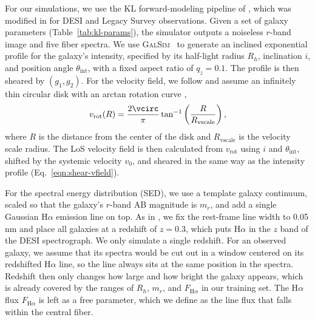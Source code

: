 For our simulations, we use the KL forward-modeling pipeline of \citep{KLInferenceI}, which was modified in \citep{KLDESI} for DESI and Legacy Survey observations. Given a set of galaxy parameters (Table~\ref{tab:kl-params}), the simulator outputs a noiseless $r$-band image and five fiber spectra. We use \textsc{GalSim}~\citep{galsim} to generate an inclined exponential profile for the galaxy's intensity, specified by its half-light radius $R_h$, inclination $i$, and position angle $\theta_\mathrm{int}$, with a fixed aspect ratio of $q_z=0.1$. The profile is then sheared by $(g_1, g_2)$. For the velocity field, we follow \citep{KLDESI} and assume an infinitely thin circular disk with an arctan rotation curve \citep{Courteau97},
\begin{equation}
\label{eqn:vrot}
    v_\mathrm{rot}(R) = \frac{2\vcirc}{\pi}\tan^{-1}\left(\frac{R}{R_\mathrm{vscale}}\right),
\end{equation}
where $R$ is the distance from the center of the disk and $R_\mathrm{vscale}$ is the velocity scale radius. The LoS velocity field is then calculated from $v_\mathrm{rot}$ using $i$ and $\theta_\mathrm{int}$, shifted by the systemic velocity $v_0$, and sheared in the same way as the intensity profile (Eq.~\ref{eqn:shear-vfield}).

For the spectral energy distribution (SED), we use a template galaxy continuum, scaled so that the galaxy's $r$-band AB magnitude is $m_r$, and add a single Gaussian H$\alpha$ emission line on top.  As in \citep{KLDESI}, we fix the rest-frame line width to 0.05 nm and place all galaxies at a redshift of $z=0.3$, which puts H$\alpha$ in the $z$ band of the DESI spectrograph. We only simulate a single redshift. For an observed galaxy, we assume that its spectra would be cut out in a window centered on its redshifted H$\alpha$ line, so the line always sits at the same position in the spectra. Redshift then only changes how large and how bright the galaxy appears, which is already covered by the ranges of $R_h$, $m_r$, and $F_{\mathrm{H}\alpha}$ in our training set.  The H$\alpha$ flux $F_{\mathrm{H}\alpha}$ is left as a free parameter, which we define as the line flux that falls within the central fiber.

